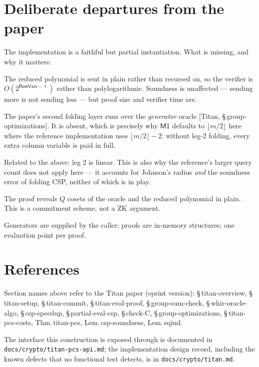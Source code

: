 \documentclass[11pt,a4paper]{article}
\newcommand{\paper}[1]{\textsf{[Titan, #1]}}
\theoremstyle{definition}
\begin{document}
\section{Deliberate departures from the paper}
\label{sec:notdone}

The implementation is a faithful but partial instantiation. What is missing, and why it
matters:

\begin{description}[leftmargin=*,style=nextline]
  \item[Not WHIR proper.] The reduced polynomial is sent in plain rather than recursed
    on, so the verifier is $O(2^{\mathsf{RowVars}-\ell})$ rather than
    polylogarithmic. Soundness is unaffected --- sending more is not sending less ---
    but proof size and verifier time are.
  \item[No $O(n^{1/4})$ layer.] The paper's second folding layer runs over the
    \emph{generator} oracle \paper{\S\,group-optimizations}. It is absent, which is
    precisely why $\mathsf{M1}$ defaults to $\lfloor m/2 \rfloor$ here where the
    reference implementation uses $\lfloor m/2 \rfloor - 2$: without leg-2 folding,
    every extra column variable is paid in full.
  \item[No CSP folding.] Related to the above: leg 2 is linear. This is also why the
    reference's larger query count does not apply here --- it accounts for Johnson's
    radius \emph{and} the soundness error of folding CSP, neither of which is in play.
  \item[No zero knowledge.] The proof reveals $Q$ cosets of the oracle and the reduced
    polynomial in plain. This is a commitment scheme, not a ZK argument.
  \item[No serialization, no batching, no trusted setup.] Generators are supplied by
    the caller; proofs are in-memory structures; one evaluation point per proof.
\end{description}

\section{References}

Section names above refer to the Titan paper (eprint version): \S\,titan-overview,
\S\,titan-setup, \S\,titan-commit, \S\,titan-eval-proof, \S\,group-sum-check,
\S\,whir-oracle-algo, \S\,csp-speedup, \S\,partial-eval-csp, \S\,check-C,
\S\,group-optimizations, \S\,titan-pcs-costs, Thm.\,titan-pcs, Lem.\,csp-soundness,
Lem.\,eqind.

The interface this construction is exposed through is documented in
\texttt{docs/crypto/titan-pcs-api.md}; the implementation design record, including the
known defects that no functional test detects, is in \texttt{docs/crypto/titan.md}.
\end{document}
